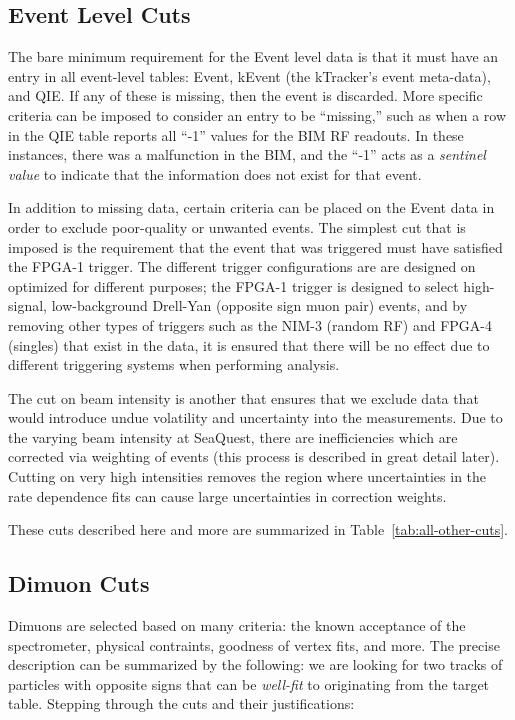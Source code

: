 \subsection{Event Level Cuts}

The bare minimum requirement for the Event level data is that it must have an entry in all event-level tables: Event, kEvent (the kTracker's event meta-data), and QIE. If any of these is missing, then the event is discarded. More specific criteria can be imposed to consider an entry to be ``missing,'' such as when a row in the QIE table reports all ``-1'' values for the BIM RF readouts. In these instances, there was a malfunction in the BIM, and the ``-1'' acts as a \emph{sentinel value} to indicate that the information does not exist for that event.

In addition to missing data, certain criteria can be placed on the Event data in order to exclude poor-quality or unwanted events. The simplest cut that is imposed is the requirement that the event that was triggered must have satisfied the FPGA-1 trigger. The different trigger configurations are are designed on optimized for different purposes; the FPGA-1 trigger is designed to select high-signal, low-background Drell-Yan (opposite sign muon pair) events, and by removing other types of triggers such as the NIM-3 (random RF) and FPGA-4 (singles) that exist in the data, it is ensured that there will be no effect due to different triggering systems when performing analysis.

The cut on beam intensity is another that ensures that we exclude data that would introduce undue volatility and uncertainty into the measurements. Due to the varying beam intensity at SeaQuest, there are inefficiencies which are corrected via weighting of events (this process is described in great detail later). Cutting on very high intensities removes the region where uncertainties in the rate dependence fits can cause large uncertainties in correction weights. 

These cuts described here and more are summarized in Table~\ref{tab:all-other-cuts}.

\subsection{Dimuon Cuts}

Dimuons are selected based on many criteria: the known acceptance of the spectrometer, physical contraints, goodness of vertex fits, and more. The precise description can be summarized by the following: we are looking for two tracks of particles with opposite signs that can be \emph{well-fit} to originating from the target table. Stepping through the cuts and their justifications:

